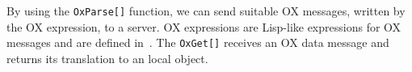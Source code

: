 By using the {\tt OxParse[]} function, we can send suitable OX messages,
written by the OX expression, to a server.  OX expressions are
Lisp-like expressions for OX messages and are defined
in~\cite{noro-takayama}.  
The {\tt OxGet[]} receives an OX data message
and returns its translation to an local object.

